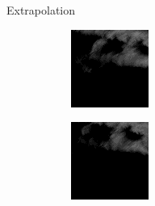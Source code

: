 \documentclass{beamer}
\begin{document}
\begin{frame}{Extrapolation}
	\begin{figure}
	    \begin{subfigure}{.3\textwidth}
	        \centering
	        \begin{mdframed}[style=blue,nobreak=true,align=center]
	        \includegraphics[width=\linewidth]{fig/extra/3.png}
	        \end{mdframed}
	    \end{subfigure}
	    \begin{subfigure}{.3\textwidth}
	        \centering
	        \begin{mdframed}[style=red,nobreak=true,align=center]
	        \includegraphics[width=\linewidth]{fig/extra/4.png}

\end{mdframed}
\end{subfigure}
\end{figure}
\end{frame}
\end{document}
